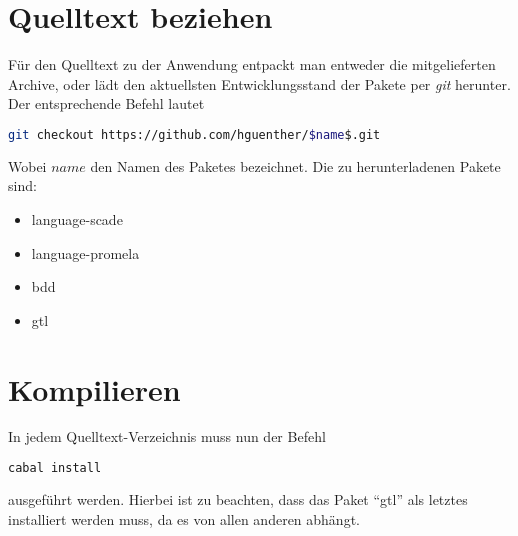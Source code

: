 \section{Quelltext beziehen}
Für den Quelltext zu der Anwendung entpackt man entweder die mitgelieferten Archive, oder lädt den aktuellsten Entwicklungsstand der Pakete per \emph{git} herunter.
Der entsprechende Befehl lautet
\begin{lstlisting}[language=bash,mathescape=true]
git checkout https://github.com/hguenther/$name$.git
\end{lstlisting}
Wobei $name$ den Namen des Paketes bezeichnet.
Die zu herunterladenen Pakete sind:
\begin{itemize}
\item language-scade
\item language-promela
\item bdd
\item gtl
\end{itemize}
\section{Kompilieren}
In jedem Quelltext-Verzeichnis muss nun der Befehl
\begin{lstlisting}[language=bash]
cabal install
\end{lstlisting}
ausgeführt werden.
Hierbei ist zu beachten, dass das Paket "`gtl"' als letztes installiert werden muss, da es von allen anderen abhängt.
